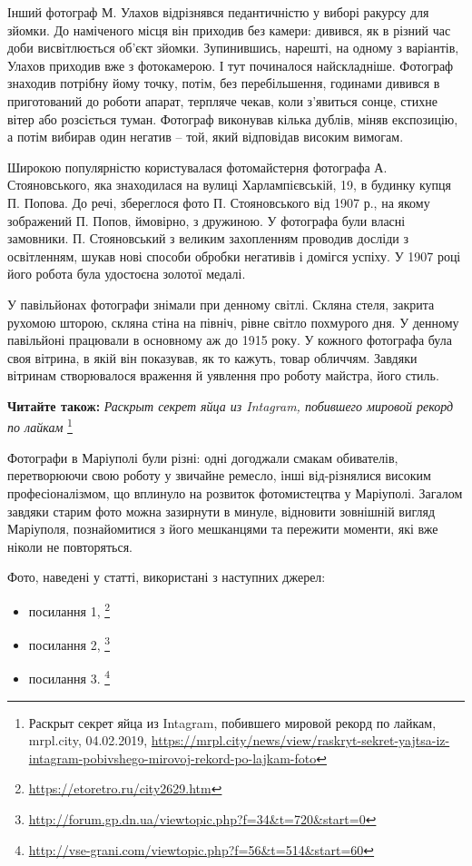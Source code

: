 Інший фотограф М. Улахов відрізнявся педантичністю у виборі ракурсу для зйомки.
До наміченого місця він приходив без камери: дивився, як в різний час доби
висвітлюється об'єкт зйомки. Зупинившись, нарешті, на одному з варіантів,
Улахов приходив вже з фотокамерою. І тут починалося найскладніше. Фотограф
знаходив потрібну йому точку, потім, без перебільшення, годинами дивився в
приготований до роботи апарат, терпляче чекав, коли з'явиться сонце, стихне
вітер або розсіється туман. Фотограф виконував кілька дублів, міняв експозицію,
а потім вибирав один негатив – той, який відповідав високим вимогам.


Широкою популярністю користувалася фотомайстерня фотографа А. Стояновського,
яка знаходилася на вулиці Харлампієвській, 19, в будинку купця П. Попова. До
речі, збереглося фото П. Стояновського від 1907 р., на якому зображений П.
Попов, ймовірно, з дружиною. У фотографа були власні замовники. П. Стояновський
з великим захопленням проводив досліди з освітленням, шукав нові способи
обробки негативів і домігся успіху. У 1907 році його робота була удостоєна
золотої медалі.

У павільйонах фотографи знімали при денному світлі. Скляна стеля, закрита
рухомою шторою, скляна стіна на північ, рівне світло похмурого дня. У денному
павільйоні працювали в основному аж до 1915 року. У кожного фотографа була своя
вітрина, в якій він показував, як то кажуть, товар обличчям. Завдяки вітринам
створювалося враження й уявлення про роботу майстра, його стиль.

\textbf{Читайте також:} \emph{Раскрыт секрет яйца из Intagram, побившего мировой рекорд по лайкам}%
\footnote{Раскрыт секрет яйца из Intagram, побившего мировой рекорд по лайкам, mrpl.city, 04.02.2019, %
\url{https://mrpl.city/news/view/raskryt-sekret-yajtsa-iz-intagram-pobivshego-mirovoj-rekord-po-lajkam-foto}
}

Фотографи в Маріуполі були різні: одні догоджали смакам обивателів,
перетворюючи свою роботу у звичайне ремесло, інші від\hyp{}різнялися високим
професіоналізмом, що вплинуло на розвиток фотомистецтва у Маріуполі. Загалом
завдяки старим фото можна зазирнути в минуле, відновити зовнішній вигляд
Маріуполя, познайомитися з його мешканцями та пережити моменти, які вже ніколи
не повторяться.

Фото, наведені у статті, використані з наступних джерел: 

\begin{itemize}
\item посилання 1, \footnote{\url{https://etoretro.ru/city2629.htm}}
\item посилання 2, \footnote{\url{http://forum.gp.dn.ua/viewtopic.php?f=34&t=720&start=0}}
\item посилання 3. \footnote{\url{http://vse-grani.com/viewtopic.php?f=56&t=514&start=60}}
\end{itemize}

